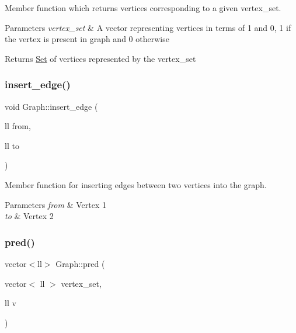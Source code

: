 Member function which returns vertices corresponding to a given vertex\+\_\+set. 


\begin{DoxyParams}{Parameters}
{\em vertex\+\_\+set} & A vector representing vertices in terms of 1 and 0, 1 if the vertex is present in graph and 0 otherwise \\
\hline
\end{DoxyParams}
\begin{DoxyReturn}{Returns}
\hyperlink{classSet}{Set} of vertices represented by the vertex\+\_\+set 
\end{DoxyReturn}
\mbox{\label{classGraph_af8290de63bf9336aea89bf7bca9e054b}} 
\subsubsection{\texorpdfstring{insert\+\_\+edge()}{insert\_edge()}}
{\footnotesize\ttfamily void Graph\+::insert\+\_\+edge (\begin{DoxyParamCaption}\item[{ll}]{from,  }\item[{ll}]{to }\end{DoxyParamCaption})\hspace{0.3cm}{\ttfamily [inline]}}



Member function for inserting edges between two vertices into the graph. 


\begin{DoxyParams}{Parameters}
{\em from} & Vertex 1 \\
\hline
{\em to} & Vertex 2 \\
\hline
\end{DoxyParams}
\mbox{\label{classGraph_aa9bb861babacf50c211afc72b5f424fb}} 
\subsubsection{\texorpdfstring{pred()}{pred()}}
{\footnotesize\ttfamily vector$<$ll$>$ Graph\+::pred (\begin{DoxyParamCaption}\item[{vector$<$ ll $>$}]{vertex\+\_\+set,  }\item[{ll}]{v }\end{DoxyParamCaption})\hspace{0.3cm}{\ttfamily [inline]}}



